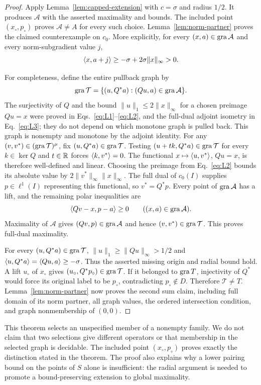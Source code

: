 \begin{proof}
Apply Lemma~\ref{lem:capped-extension} with $c=\sigma$ and radius
$1/2$. It produces $\mathcal A$ with the asserted maximality and
bounds. The included point $(x_\circ,p_\circ)$ proves
$\mathcal A\ne A$ for every such choice. Lemma~\ref{lem:norm-partner}
proves the claimed counterexample on $c_0$. More explicitly, for every
$(x,a)\in\operatorname{gra}\mathcal A$ and every norm-subgradient value $j$,
\[
\langle x,a+j\rangle\ge-\sigma+2\sigma\|x\|_\infty>0.
\]

For completeness, define the entire pullback graph by
\[
\operatorname{gra}\mathcal T=\{(u,Q^*a):(Qu,a)\in\operatorname{gra}\mathcal A\}.
\]
The surjectivity of $Q$ and the bound $\|u\|_1\le2\|x\|_\infty$ for a
chosen preimage $Qu=x$ were proved in
Eqs.~\eqref{eq:L1}--\eqref{eq:L2}, and the full-dual adjoint isometry
in Eq.~\eqref{eq:L3}; they do not depend on which monotone graph is
pulled back. This graph is nonempty and monotone by the adjoint identity.
For any $(v,v^*)\in(\operatorname{gra}\mathcal T)^\mu$, fix
$(u,Q^*a)\in\operatorname{gra}\mathcal T$. Testing $(u+t k,Q^*a)\in\operatorname{gra}\mathcal T$
for every $k\in\ker Q$ and $t\in\mathbb R$ forces $\langle k,v^*\rangle=0$. The functional
$x\mapsto\langle u,v^*\rangle$, $Qu=x$, is therefore well-defined and linear.
Choosing the preimage from Eq.~\eqref{eq:L2} bounds its absolute value
by $2\|v^*\|_\infty\|x\|_\infty$.
The full dual of $c_0(I)$ supplies $p\in\ell^1(I)$ representing this
functional, so $v^*=Q^*p$. Every point of $\operatorname{gra}\mathcal A$ has a lift, and
the remaining polar inequalities are
\[
\langle Qv-x,p-a\rangle\ge0\qquad((x,a)\in\operatorname{gra}\mathcal A).
\]
Maximality of $\mathcal A$ gives $(Qv,p)\in\operatorname{gra}\mathcal A$ and hence
$(v,v^*)\in\operatorname{gra}\mathcal T$. This proves full-dual maximality.

For every $(u,Q^*a)\in\operatorname{gra}\mathcal T$, $\|u\|_1\ge\|Qu\|_\infty>1/2$ and
$\langle u,Q^*a\rangle=\langle Qu,a\rangle\ge-\sigma$. Thus the asserted missing
origin and radial bound hold. A lift $u_\circ$ of $x_\circ$ gives
$(u_\circ,Q^*p_\circ)\in\operatorname{gra}\mathcal T$. If it belonged to $\operatorname{gra} T$,
injectivity of $Q^*$ would force its original label to be $p_\circ$,
contradicting $p_\circ\notin D$. Therefore $\mathcal T\ne T$.
Lemma~\ref{lem:norm-partner} now proves the second sum claim, including
full domain of its norm partner, all graph values, the ordered
intersection condition, and graph nonmembership of $(0,0)$.
\end{proof}

This theorem selects an unspecified member of a nonempty family. We do
not claim that two selections give different operators or that membership
in the selected graph is decidable. The included point $(x_\circ,p_\circ)$ proves exactly the
distinction stated in the theorem. The proof also explains why a lower
pairing bound on the points of $S$ alone is insufficient: the radial argument
is needed to promote a bound-preserving extension to global maximality.


